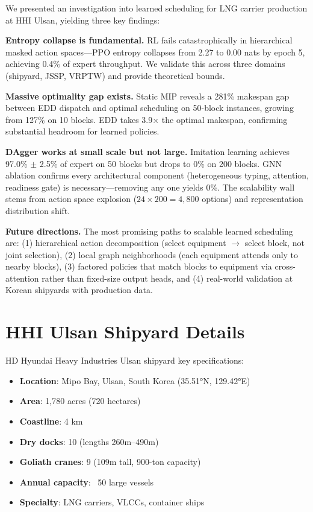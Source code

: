 \documentclass[11pt,a4paper]{article}
\begin{document}
We presented an investigation into learned scheduling for LNG carrier production at HHI Ulsan, yielding three key findings:

\textbf{Entropy collapse is fundamental.} RL fails catastrophically in hierarchical masked action spaces---PPO entropy collapses from 2.27 to 0.00 nats by epoch 5, achieving 0.4\% of expert throughput. We validate this across three domains (shipyard, JSSP, VRPTW) and provide theoretical bounds.

\textbf{Massive optimality gap exists.} Static MIP reveals a 281\% makespan gap between EDD dispatch and optimal scheduling on 50-block instances, growing from 127\% on 10 blocks. EDD takes 3.9$\times$ the optimal makespan, confirming substantial headroom for learned policies.

\textbf{DAgger works at small scale but not large.} Imitation learning achieves 97.0\% $\pm$ 2.5\% of expert on 50 blocks but drops to 0\% on 200 blocks. GNN ablation confirms every architectural component (heterogeneous typing, attention, readiness gate) is necessary---removing any one yields 0\%. The scalability wall stems from action space explosion ($24 \times 200 = 4{,}800$ options) and representation distribution shift.

\textbf{Future directions.} The most promising paths to scalable learned scheduling are: (1) hierarchical action decomposition (select equipment $\to$ select block, not joint selection), (2) local graph neighborhoods (each equipment attends only to nearby blocks), (3) factored policies that match blocks to equipment via cross-attention rather than fixed-size output heads, and (4) real-world validation at Korean shipyards with production data.





\appendix

\section{HHI Ulsan Shipyard Details}
\label{app:hhi}

HD Hyundai Heavy Industries Ulsan shipyard key specifications:
\begin{itemize}
    \item \textbf{Location}: Mipo Bay, Ulsan, South Korea (35.51°N, 129.42°E)
    \item \textbf{Area}: 1,780 acres (720 hectares)
    \item \textbf{Coastline}: 4 km
    \item \textbf{Dry docks}: 10 (lengths 260m--490m)
    \item \textbf{Goliath cranes}: 9 (109m tall, 900-ton capacity)
    \item \textbf{Annual capacity}: ~50 large vessels
    \item \textbf{Specialty}: LNG carriers, VLCCs, container ships
\end{itemize}
\end{document}
